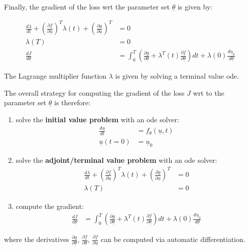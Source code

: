     Finally, the gradient of the loss wrt the parameter set $\underline{\theta}$ is given by:
    \begin{tcolorbox}[colback=blue!5!white,colframe=black!75!black,title=Gradient computation by adjoint method]
        \begin{align}
            \frac{d \lambda}{dt} + \left( \frac{\partial \underline{f}}{\partial \underline{u}}\right)^{T} \lambda(t) + \left( \frac{\partial g}{\partial \underline{u}}\right)^{T} &= 0 \\
            \lambda(T) &= 0 \\
            \frac{dJ}{d \underline{\theta}} &= \int_{0}^{T} \left( \frac{\partial g}{\partial \underline{\theta}} + \lambda^{T}(t) \frac{\partial \underline{f}}{\partial \underline{\theta}} \right) dt
            + \lambda(0) \frac{d \underline{u}_0}{d \underline{\theta}}
        \end{align}
    \end{tcolorbox}
    The Lagrange multiplier function $\lambda$ is given by solving a terminal value \gls{ode}.

The overall strategy for computing the gradient of the loss $J$ wrt to the parameter set $\underline{\theta}$ is therefore:
    \begin{tcolorbox}[colback=blue!5!white,colframe=black!75!black,title=Strategy for computing the gradient of the loss $J$ wrt $\underline{\theta}$]
        \begin{enumerate}
            \item solve the \textbf{initial value problem} with an \gls{ode} solver:
                \begin{align}
                    \frac{d \underline{u}}{dt} &= f_{\theta}(\underline{u},t) \\
                    \underline{u}(t=0) &= \underline{u}_0
                \end{align}
            \item solve the \textbf{adjoint/terminal value problem} with an \gls{ode} solver:
                \begin{align}
                    \label{adjoint}
                    \frac{d \lambda}{dt} + \left( \frac{\partial \underline{f}}{\partial \underline{u}}\right)^{T} \lambda(t) + \left( \frac{\partial g}{\partial \underline{u}}\right)^{T} &= 0 \\
                    \lambda(T) &= 0
                \end{align}
            \item compute the gradient:
                \begin{align}
                    \frac{dJ}{d \underline{\theta}} &= \int_{0}^{T} \left( \frac{\partial g}{\partial \underline{\theta}} + \lambda^{T}(t) \frac{\partial \underline{f}}{\partial \underline{\theta}} \right) dt
                        + \lambda(0) \frac{d \underline{u}_0}{d \underline{\theta}}
                \end{align}
        \end{enumerate}
    \end{tcolorbox}

    where the derivatives $\frac{\partial g}{\partial \underline{\theta}}$, $\frac{\partial \underline{f}}{\partial \underline{\theta}}$, $\frac{\partial \underline{f}}{\partial \underline{u}}$ can 
    be computed via automatic differentiation.